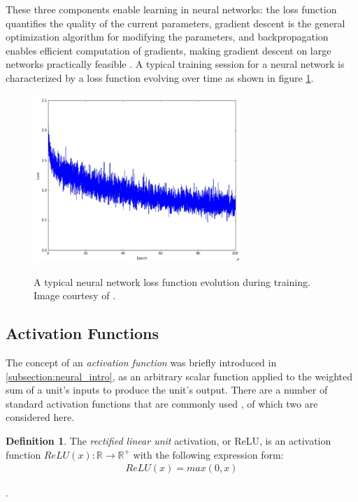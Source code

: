 \documentclass[12pt, titlepage]{report}
\theoremstyle{definition}
\newtheorem{definition}{Definition}
\begin{document}
These three components enable learning in neural networks: the loss function quantifies the quality of the current parameters, gradient descent is the general optimization algorithm for modifying the parameters, and backpropagation enables efficient computation of gradients, making gradient descent on large networks practically feasible \cite[Optimization: Stochastic Gradient Descent]{karpathy2017cs231n}. A typical training session for a neural network is characterized by a loss function evolving over time as shown in figure \ref{figure:typical_loss}.

\begin{figure}
    \centering
    \includegraphics[width=0.7\textwidth]{img/typical_loss.png}\\
    \caption[Typical loss over time]{A typical neural network loss function evolution during training. Image courtesy of \cite[Neural Networks Part 3: Learning and Evaluation]{karpathy2017cs231n}.}
    \label{figure:typical_loss}
    \end{figure}


\subsection{Activation Functions}
The concept of an \emph{activation function} was briefly introduced in \ref{subsection:neural_intro}, as an arbitrary scalar function applied to the weighted sum of a unit's inputs to produce the unit's output. There are a number of standard activation functions that are commonly used \cite[Neural Networks Part 1: Setting up the Architecture]{karpathy2017cs231n}, of which two are considered here.

\begin{definition}
The \emph{rectified linear unit} activation, or ReLU, is an activation function $ReLU(x) : \mathbb{R} \rightarrow \mathbb{R}^{+}$ with the following expression form:
\begin{gather}\label{eq:relu}
ReLU(x) = max(0, x)
\end{gather}
\end{definition}.
\end{document}
